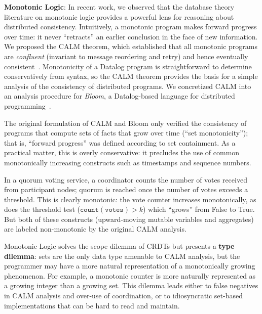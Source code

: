 
\vspace{0.5em} \noindent
\textbf{Monotonic Logic}: In recent work, we observed that the database theory
literature on monotonic logic provides a powerful lens for reasoning about
distributed consistency. Intuitively, a monotonic program makes forward progress
over time: it never ``retracts'' an earlier conclusion in the face of new
information. We proposed the CALM theorem, which established that all monotonic
programs are \emph{confluent} (invariant to message reordering and retry) and
hence eventually
consistent~\cite{Ameloot2011,Hellerstein2010,dedalus-confluence}. Monotonicity
of a Datalog program is straightforward to determine conservatively from syntax,
so the CALM theorem provides the basis for a simple analysis of the consistency of distributed programs. We concretized CALM into an
analysis procedure for \emph{Bloom}, a Datalog-based language for distributed
programming~\cite{Alvaro2011,bloom}.

The original formulation of CALM and Bloom only verified the consistency of
programs that compute sets of facts that grow over time (``set monotonicity'');
that is, ``forward progress'' was defined according to set containment. As a
practical matter, this is overly conservative: it precludes the use of common
monotonically increasing constructs such as timestamps and sequence numbers.

\vspace{-0.25em}
\begin{example}  In a
quorum voting service, a coordinator counts the number of votes received
from participant nodes; quorum is reached once the number of votes exceeds a
threshold. This is clearly monotonic: the vote counter increases
monotonically, as does the threshold test ($\mathtt{count(votes)} > k$) which ``grows'' from False to True. But both of these constructs (upward-moving
mutable variables and aggregates) are labeled non-monotonic by the
original CALM analysis.
\end{example}

\vspace{-.25em}
Monotonic Logic solves the scope dilemma of CRDTs but presents a \textbf{type dilemma}: sets are the only data type amenable to CALM analysis, but the programmer may have a more natural representation of a monotonically growing phenomenon. For example, a monotonic counter is more naturally represented as a growing integer than a growing set. This dilemma leads either to false negatives in CALM analysis and over-use of coordination, or to idiosyncratic set-based implementations that can be hard to read and maintain.

